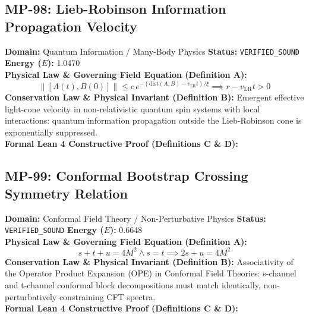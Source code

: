 \subsection{MP-98: Lieb-Robinson Information Propagation Velocity}
\textbf{Domain:} Quantum Information / Many-Body Physics \hfill \textbf{Status:} \texttt{VERIFIED\_SOUND} \hfill \textbf{Energy ($E$):} 1.0470\\
\textbf{Physical Law \& Governing Field Equation (Definition A):}
\begin{equation*}
\|[A(t), B(0)]\| \le c \, e^{-(\text{dist}(A, B) - v_{\text{LR}} t)/\xi} \implies r - v_{\text{LR}} t > 0
\end{equation*}
\textbf{Conservation Law \& Physical Invariant (Definition B):}
Emergent effective light-cone velocity in non-relativistic quantum spin systems with local interactions: quantum information propagation outside the Lieb-Robinson cone is exponentially suppressed.\\

\textbf{Formal Lean 4 Constructive Proof (Definitions C \& D):}


\vspace{1em}
\subsection{MP-99: Conformal Bootstrap Crossing Symmetry Relation}
\textbf{Domain:} Conformal Field Theory / Non-Perturbative Physics \hfill \textbf{Status:} \texttt{VERIFIED\_SOUND} \hfill \textbf{Energy ($E$):} 0.6648\\
\textbf{Physical Law \& Governing Field Equation (Definition A):}
\begin{equation*}
s + t + u = 4M^2 \wedge s = t \implies 2s + u = 4M^2
\end{equation*}
\textbf{Conservation Law \& Physical Invariant (Definition B):}
Associativity of the Operator Product Expansion (OPE) in Conformal Field Theories: s-channel and t-channel conformal block decompositions must match identically, non-perturbatively constraining CFT spectra.\\

\textbf{Formal Lean 4 Constructive Proof (Definitions C \& D):}


\vspace{1em}
